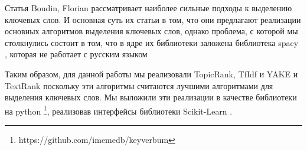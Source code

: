 \documentclass[14pt]{matmex-diploma-custom}
\begin{document}
Статья Boudin, Florian \cite{boudin:2016:COLINGDEMO} рассматривает наиболее сильные подходы к выделению ключевых слов.
И основная суть их статьи в том, что они предлагают реализации основных алгоритмов выделения ключевых слов, однако проблема,
с которой мы столкнулись состоит в том, что в ядре их библиотеки заложена библиотека spacy \cite{honnibal-johnson:2015:EMNLP}, которая не работает с русским языком

Таким образом, для данной работы мы реализовали TopicRank, TfIdf и YAKE и TextRank поскольку эти алгоритмы считаются лучшими алгоритмами для выделения ключевых слов. Мы выложили эти реализации в качестве библиотеки на python \footnote{https://github.com/imemedb/keyverbum}, реализовав интерфейсы библиотеки Scikit-Learn \cite{scikit-learn, sklearn_api}.

\end{document}
